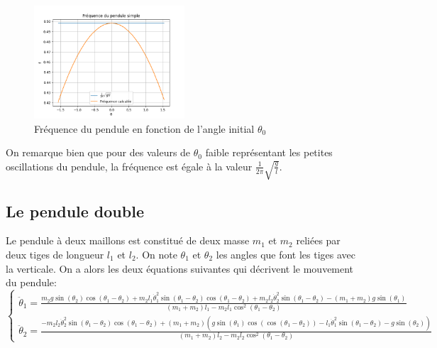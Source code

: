 \begin{figure}[htbp!]
	\centering
	\includegraphics[width=0.5\textwidth]{res/freq_pendule_simple.png}
	\caption{Fréquence du pendule en fonction de l'angle initial $ \theta_{0}$}
	\label{fig:frequences}
\end{figure}

\bigskip

On remarque bien que pour des valeurs de $ \theta_{0} $ faible représentant les petites oscillations du pendule, 
la fréquence est égale à la valeur $ \frac{1}{2 \pi} \sqrt{\frac{g}{l}} $.

\subsection*{Le pendule double} Le pendule à deux maillons est constitué de deux masse $ m_{1} $ et $ m_{2} $ 
reliées par deux tiges de longueur $ l_{1} $ et $ l _{2} $. On note $ \theta_{1} $ et $ \theta_{2} $ les angles
que font les tiges avec la verticale. On a alors les deux équations suivantes qui décrivent le mouvement du pendule:
\begin{equation}
	\begin{cases}
		\ddot \theta_{1} = \frac{m_{2} g \sin(\theta_{2}) \cos(\theta_{1} - \theta_{2}) + m_{2} l_{1} \dot \theta_{1}^{2} \sin(\theta_{1} - \theta_{2}) \cos(\theta_{1} - \theta_{2}) + m_{2} l_{2} \dot \theta_{2}^{2} \sin(\theta_{1} - \theta_{2}) - (m_{1} + m_{2}) g \sin(\theta_{1})}{(m_{1} + m_{2}) l_{1} - m_{2} l_{1} \cos^{2}(\theta_{1} - \theta_{2})}  \\ \nonumber
		\ddot \theta_{2} = \frac{- m_{2} l_{2} \dot \theta_{2}^{2} \sin(\theta_{1} - \theta_{2}) \cos(\theta_{1} - \theta_{2}) + (m_{1} + m_{2}) (g \sin(\theta_{1}) \cos( \cos(\theta_{1} - \theta_{2})) - l_{1} \dot \theta_{1}^{2} \sin(\theta_{1} - \theta_{2}) - g \sin(\theta_{2}))}{(m_{1} + m_{2}) l_{2} - m_{2} l_{2} \cos^{2}(\theta_{1} - \theta_{2})}  
	\end{cases}
	\label{eq:pendule_2_maillons}
\end{equation}


